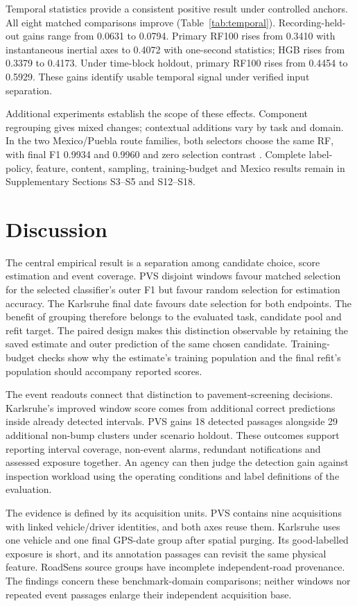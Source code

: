 Temporal statistics provide a consistent positive result under controlled anchors. All eight matched comparisons improve (Table~\ref{tab:temporal}). Recording-held-out gains range from 0.0631 to 0.0794. Primary RF100 rises from 0.3410 with instantaneous inertial axes to 0.4072 with one-second statistics; HGB rises from 0.3379 to 0.4173. Under time-block holdout, primary RF100 rises from 0.4454 to 0.5929. These gains identify usable temporal signal under verified input separation.

Additional experiments establish the scope of these effects. Component regrouping gives mixed changes; contextual additions vary by task and domain. In the two Mexico/Puebla route families, both selectors choose the same RF, with final F1 0.9934 and 0.9960 and zero selection contrast \citep{mexico2025,mexico2026}. Complete label-policy, feature, content, sampling, training-budget and Mexico results remain in Supplementary Sections S3--S5 and S12--S18.

\section{Discussion}
The central empirical result is a separation among candidate choice, score estimation and event coverage. PVS disjoint windows favour matched selection for the selected classifier's outer F1 but favour random selection for estimation accuracy. The Karlsruhe final date favours date selection for both endpoints. The benefit of grouping therefore belongs to the evaluated task, candidate pool and refit target. The paired design makes this distinction observable by retaining the saved estimate and outer prediction of the same chosen candidate. Training-budget checks show why the estimate's training population and the final refit's population should accompany reported scores.

The event readouts connect that distinction to pavement-screening decisions. Karlsruhe's improved window score comes from additional correct predictions inside already detected intervals. PVS gains 18 detected passages alongside 29 additional non-bump clusters under scenario holdout. These outcomes support reporting interval coverage, non-event alarms, redundant notifications and assessed exposure together. An agency can then judge the detection gain against inspection workload using the operating conditions and label definitions of the evaluation.

The evidence is defined by its acquisition units. PVS contains nine acquisitions with linked vehicle/driver identities, and both axes reuse them. Karlsruhe uses one vehicle and one final GPS-date group after spatial purging. Its good-labelled exposure is short, and its annotation passages can revisit the same physical feature. RoadSens source groups have incomplete independent-road provenance. The findings concern these benchmark-domain comparisons; neither windows nor repeated event passages enlarge their independent acquisition base.

